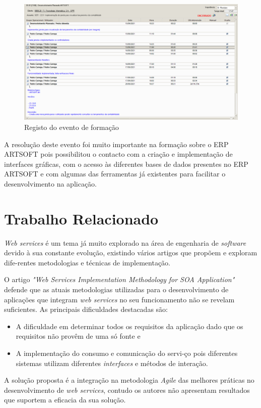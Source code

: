 \documentclass[sigplan]{acmart}
\begin{document}
\FloatBarrier
\begin{figure}[htbp]
	\centerline{\includegraphics[width=\linewidth]{figures/evento_formacao.png}}
	\caption{Registo do evento de formação}
	\label{fig2}
\end{figure}
\FloatBarrier
A resolução deste evento foi muito importante na formação sobre o ERP ARTSOFT pois possibilitou o contacto com a criação e implementação de interfaces gráficas, com o acesso às diferentes bases de dados presentes no ERP ARTSOFT e com algumas das ferramentas já existentes para facilitar o desenvolvimento na aplicação.

\section{Trabalho Relacionado} \label{sec:relatedwork}

\textit{Web services} é um tema já muito explorado na área de engenharia de \textit{software} devido à sua constante evolução, existindo vários artigos que propõem e exploram dife-rentes metodologias e técnicas de implementação.



O artigo \textit{"Web Services Implementation Methodology for SOA Application"}\cite{SOAA} defende que as atuais metodologias utilizadas para o desenvolvimento de aplicações que integram \textit{web services} no seu funcionamento não se revelam suficientes. As principais dificuldades  destacadas são:
\begin{itemize}
  \item A dificuldade em determinar todos os requisitos da aplicação dado que os requisitos não provêm de uma só fonte e
  \item A implementação do consumo e comunicação do servi-ço pois diferentes sistemas utilizam diferentes \textit{interfaces} e métodos de interação.
\end{itemize}
  A solução proposta é a integração na metodologia \textit{Agile} das melhores práticas no desenvolvimento de \textit{web services}, contudo os autores não apresentam resultados que suportem a eficacia da sua solução.
\end{document}
